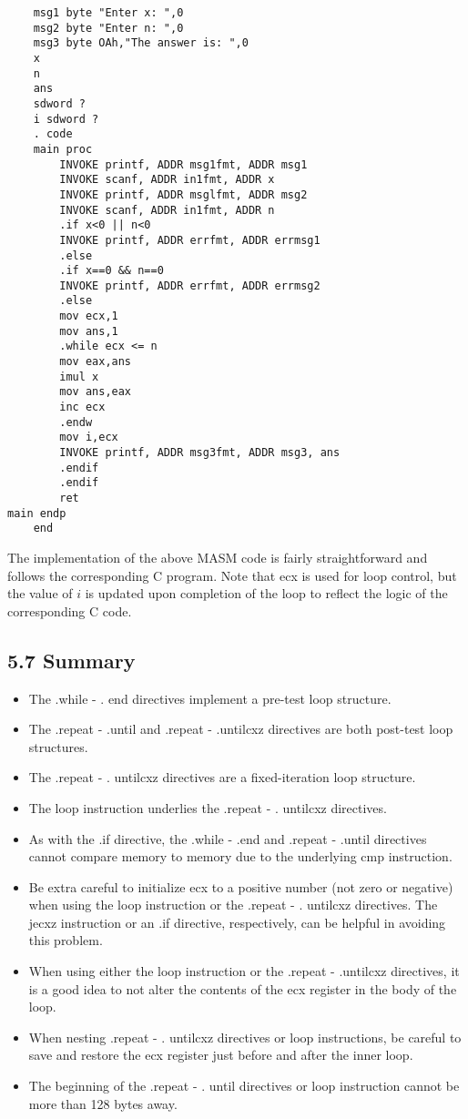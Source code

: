 \documentclass[10pt]{article}
\begin{document}
\begin{verbatim}
    msg1 byte "Enter x: ",0
    msg2 byte "Enter n: ",0
    msg3 byte OAh,"The answer is: ",0
    x
    n
    ans
    sdword ?
    i sdword ?
    . code
    main proc
        INVOKE printf, ADDR msg1fmt, ADDR msg1
        INVOKE scanf, ADDR in1fmt, ADDR x
        INVOKE printf, ADDR msglfmt, ADDR msg2
        INVOKE scanf, ADDR in1fmt, ADDR n
        .if x<0 || n<0
        INVOKE printf, ADDR errfmt, ADDR errmsg1
        .else
        .if x==0 && n==0
        INVOKE printf, ADDR errfmt, ADDR errmsg2
        .else
        mov ecx,1
        mov ans,1
        .while ecx <= n
        mov eax,ans
        imul x
        mov ans,eax
        inc ecx
        .endw
        mov i,ecx
        INVOKE printf, ADDR msg3fmt, ADDR msg3, ans
        .endif
        .endif
        ret
main endp
    end
\end{verbatim}

The implementation of the above MASM code is fairly straightforward and follows the corresponding C program. Note that ecx is used for loop control, but the value of $i$ is updated upon completion of the loop to reflect the logic of the corresponding C code.

\subsection*{5.7 Summary}
\begin{itemize}
  \item The .while - . end directives implement a pre-test loop structure.
  \item The .repeat - .until and .repeat - .untilcxz directives are both post-test loop structures.
  \item The .repeat - . untilcxz directives are a fixed-iteration loop structure.
  \item The loop instruction underlies the .repeat - . untilcxz directives.
  \item As with the .if directive, the .while - .end and .repeat - .until directives cannot compare memory to memory due to the underlying cmp instruction.
  \item Be extra careful to initialize ecx to a positive number (not zero or negative) when using the loop instruction or the .repeat - . untilcxz directives. The jecxz instruction or an .if directive, respectively, can be helpful in avoiding this problem.
  \item When using either the loop instruction or the .repeat - .untilcxz directives, it is a good idea to not alter the contents of the ecx register in the body of the loop.
  \item When nesting .repeat - . untilcxz directives or loop instructions, be careful to save and restore the ecx register just before and after the inner loop.
  \item The beginning of the .repeat - . until directives or loop instruction cannot be more than 128 bytes away.
\end{itemize}
\end{document}
